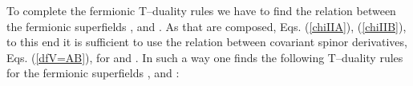 \documentclass[a4paper,11pt]{article}
\begin{document}
To complete the fermionic T--duality rules we have to find 
the relation between the fermionic superfields 
\coordHE{}, \coordHE{} 
and  \coordHE{}. As that are composed, 
Eqs.  (\ref{chiIIA}), (\ref{chiIIB}), 
to this end it is sufficient to use the relation 
between covariant spinor derivatives, 
Eqs. (\ref{dfV=AB}),  for \coordHE{} and 
\coordHE{}.
In such a way one finds 
the following T--duality rules 
for the fermionic superfields \coordHE{}, \coordHE{} and \coordHE{}:
\end{document}
